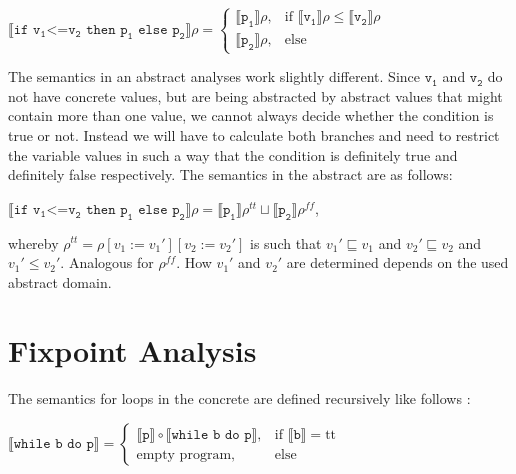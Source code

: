 \begin{center}
	$\llbracket\texttt{if v}_\texttt{1}\texttt{<=v}_\texttt{2} \texttt{ then p}_\texttt{1} \texttt{ else p}_\texttt{2}\rrbracket\rho = 
	\begin{cases}
		\llbracket\texttt{p}_\texttt{1}\rrbracket\rho, & \textrm{if } \llbracket\texttt{v}_\texttt{1}\rrbracket\rho \leq \llbracket\texttt{v}_\texttt{2}\rrbracket\rho\\
		\llbracket\texttt{p}_\texttt{2}\rrbracket\rho, & \textrm{else}
	\end{cases}$
\end{center} 
\vspace{2mm}
\noindent The semantics in an abstract analyses work slightly different. Since $\texttt{v}_\texttt{1}$ and $\texttt{v}_\texttt{2}$ do not have concrete values, but are being abstracted by abstract values that might contain more than one value, we cannot always decide whether the condition is true or not. Instead we will have to calculate both branches and need to restrict the variable values in such a way that the condition is definitely true and definitely false respectively. The semantics in the abstract are as follows:

\begin{center}
	$\llbracket\texttt{if v}_\texttt{1}\texttt{<=v}_\texttt{2} \texttt{ then p}_\texttt{1} \texttt{ else p}_\texttt{2}\rrbracket\rho = \llbracket\texttt{p}_\texttt{1}\rrbracket\rho^{t\!t} \sqcup\llbracket\texttt{p}_\texttt{2}\rrbracket\rho^{f\!\!f}$,
\end{center} 

\noindent whereby $\rho^{t\!t}=\rho[v_1:=v_1'][v_2:=v_2']$ is such that $v_1'\sqsubseteq v_1$ and $v_2'\sqsubseteq v_2$ and $v_1'\leq v_2'$. Analogous for $\rho^{f\!\!f}$. How  $v_1'$ and $v_2'$ are determined depends on the used abstract domain.

\section{Fixpoint Analysis}

The semantics for loops in the concrete are defined recursively like follows \cite{scott1971}:

\begin{center}
	$\llbracket\texttt{while b do p}\rrbracket = 
	\begin{cases}
		\llbracket\texttt{p}\rrbracket \circ \llbracket\texttt{while b do p}\rrbracket, & \textrm{if } \llbracket\texttt{b}\rrbracket=\textrm{tt}\\
		\textrm{empty program}, & \textrm{else}
	\end{cases}$
\end{center} 
\vspace{2mm}

